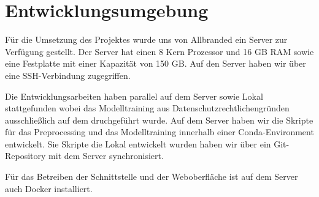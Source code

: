 \section{Entwicklungsumgebung}

Für die Umsetzung des Projektes wurde uns von Allbranded ein Server zur Verfügung gestellt.
Der Server hat einen 8 Kern Prozessor und 16 GB RAM sowie eine Festplatte mit einer Kapazität von 150 GB.
Auf den Server haben wir über eine SSH-Verbindung zugegriffen.  

Die Entwicklungsarbeiten haben parallel auf dem Server sowie Lokal stattgefunden wobei das Modelltraining
aus Datenschutzrechtlichengründen ausschließlich auf dem druchgeführt wurde. Auf dem Server haben wir die
Skripte für das Preprocessing und das Modelltraining innerhalb einer Conda-Environment entwickelt. Sie
Skripte die Lokal entwickelt wurden haben wir über ein Git-Repository mit dem Server synchronisiert.  

Für das Betreiben der Schnittstelle und der Weboberfläche ist auf dem Server auch Docker installiert.